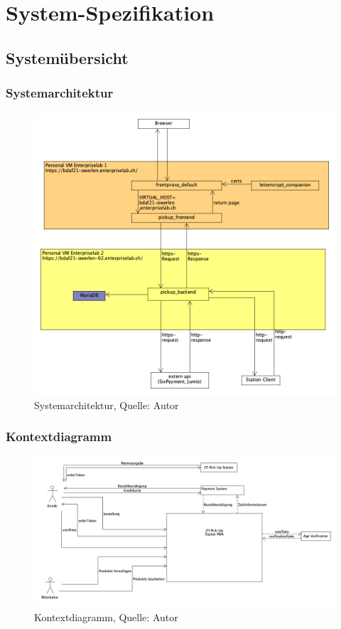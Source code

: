 \section{System-Spezifikation}\label{SystemSpezifikation}
\subsection{Systemübersicht}
\subsubsection{Systemarchitektur}
\begin{figure}[H]
    \centering
    \includegraphics[width=1\textwidth]{images/system.png}
    \caption[Systemarchitektur]{Systemarchitektur, Quelle: Autor}
    \label{img: Systemarchitektur des Projektes}
\end{figure}
\newpage
\subsubsection{Kontextdiagramm}\label{Kontextdiagram}
\begin{figure}[H]
    \centering
   \includegraphics[width=1\textwidth]{images/kontextdiagramm.png}
    \caption[Kontextdiagramm]{Kontextdiagramm, Quelle: Autor}
    \label{img: Kontextdiagramm des Projektes}
\end{figure}
\newpage
\newpage
